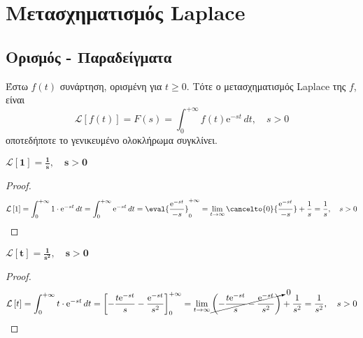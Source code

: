 



\pagestyle{vangelis}
\everymath{\displaystyle}

\renewcommand{\qedsymbol}{}

{\topsep}{\topsep}%
{}{}%
{\color{Col1}\bfseries}{}%
{\baselineskip}{}%





\chapter*{Μετασχηματισμός Laplace}

\vspace{\baselineskip}


\section*{Ορισμός - Παραδείγματα}

\begin{dfn}
  Έστω $ f(t) $ συνάρτηση, ορισμένη για $ t \geq 0 $. Τότε ο μετασχηματισμός Laplace 
  της $f$, είναι
  \begin{equation}\label{eq:laplace}
    \mathcal{L} \left[f(t)\right] = F(s) = \int _{0}^{+\infty} f(t) 
    \mathrm{e}^{-st} \,{dt}, \quad s>0
  \end{equation} 
  οποτεδήποτε το γενικευμένο ολοκλήρωμα συγκλίνει.
\end{dfn}

\begin{example}
  $ \boldsymbol{\mathcal{L}\left[1\right] = \frac{1}{s}, \quad s > 0} $
\end{example}
\begin{proof}
  \[
    \mathcal{L}\left[1\right] = \int_{0}^{+\infty} 1\cdot \mathrm{e}^{-st} \,{dt} =  
    \int_{0}^{+\infty} \mathrm{e}^{-st} \,{dt} = \eval{\frac{\mathrm{e}^{-st}}{-s}}
    _{0}^{+\infty} = \lim_{t \to \infty} \cancelto{0}{\frac{\mathrm{e}^{-st}}{-s}} 
    + \frac{1}{s} = \frac{1}{s} , \quad s>0 
  \] 
\end{proof}

\begin{example}
  $ \boldsymbol{\mathcal{L}\left[t\right] = \frac{1}{s^{2}}, \quad s>0} $
\end{example}
\begin{proof}
  \[
    \mathcal{L}\left[t\right] = \int_{0}^{+\infty} t \cdot \mathrm{e}^{-st} \,{dt} = 
    \left[-\frac{t \mathrm{e}^{-st}}{s} - \frac{\mathrm{e}^{-st}}{s^{2}}\right]
    _{0}^{+\infty} = \lim_{t \to \infty} 
    \cancelto{0}{\left(- \frac{t\mathrm{e}^{-st}}{s} -
    \frac{\mathrm{e}^{-st}}{s^{2}}\right)} + \frac{1}{s^{2}} = \frac{1}{s^{2}} , 
    \quad s>0
  \] 
\end{proof}

